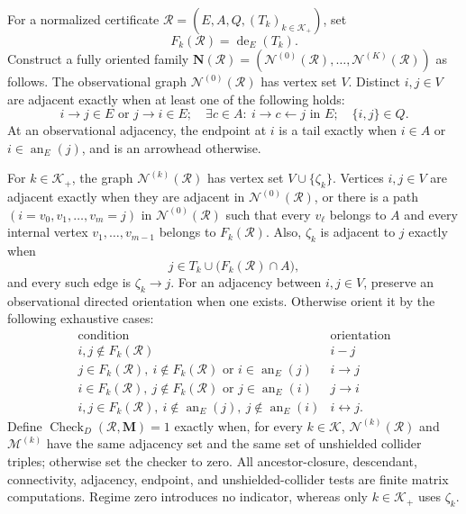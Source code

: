 For a normalized certificate \(\mathcal R=(E,A,Q,(T_k)_{k\in\mathcal K_+})\), set
\[
F_k(\mathcal R)=\operatorname{de}_E(T_k).
\]
Construct a fully oriented family \(\mathbf N(\mathcal R)=(\mathcal N^{(0)}(\mathcal R),\ldots,\mathcal N^{(K)}(\mathcal R))\) as follows.  The observational graph \(\mathcal N^{(0)}(\mathcal R)\) has vertex set \(V\).  Distinct \(i,j\in V\) are adjacent exactly when at least one of the following holds:
\[
i\to j\in E\text{ or }j\to i\in E;
\quad
\exists c\in A:\ i\to c\leftarrow j\text{ in }E;
\quad
\{i,j\}\in Q.
\]
At an observational adjacency, the endpoint at \(i\) is a tail exactly when \(i\in A\) or \(i\in\operatorname{an}_E(j)\), and is an arrowhead otherwise.

For \(k\in\mathcal K_+\), the graph \(\mathcal N^{(k)}(\mathcal R)\) has vertex set \(V\cup\{\zeta_k\}\).  Vertices \(i,j\in V\) are adjacent exactly when they are adjacent in \(\mathcal N^{(0)}(\mathcal R)\), or there is a path \((i=v_0,v_1,\ldots,v_m=j)\) in \(\mathcal N^{(0)}(\mathcal R)\) such that every \(v_\ell\) belongs to \(A\) and every internal vertex \(v_1,\ldots,v_{m-1}\) belongs to \(F_k(\mathcal R)\).  Also, \(\zeta_k\) is adjacent to \(j\) exactly when
\[
j\in T_k\cup\bigl(F_k(\mathcal R)\cap A\bigr),
\]
and every such edge is \(\zeta_k\to j\).  For an adjacency between \(i,j\in V\), preserve an observational directed orientation when one exists.  Otherwise orient it by the following exhaustive cases:
\[
\begin{array}{c|c}
\text{condition}&\text{orientation}\\ \hline
i,j\notin F_k(\mathcal R)&i\mathbin{-}j\\
j\in F_k(\mathcal R),\ i\notin F_k(\mathcal R)\text{ or }i\in\operatorname{an}_E(j)&i\to j\\
i\in F_k(\mathcal R),\ j\notin F_k(\mathcal R)\text{ or }j\in\operatorname{an}_E(i)&j\to i\\
i,j\in F_k(\mathcal R),\ i\notin\operatorname{an}_E(j),\ j\notin\operatorname{an}_E(i)&i\leftrightarrow j.
\end{array}
\]
Define \(\operatorname{Check}_{D}(\mathcal R,\mathbf M)=1\) exactly when, for every \(k\in\mathcal K\), \(\mathcal N^{(k)}(\mathcal R)\) and \(\mathcal M^{(k)}\) have the same adjacency set and the same set of unshielded collider triples; otherwise set the checker to zero.  All ancestor-closure, descendant, connectivity, adjacency, endpoint, and unshielded-collider tests are finite matrix computations.  Regime zero introduces no indicator, whereas only \(k\in\mathcal K_+\) uses \(\zeta_k\).
